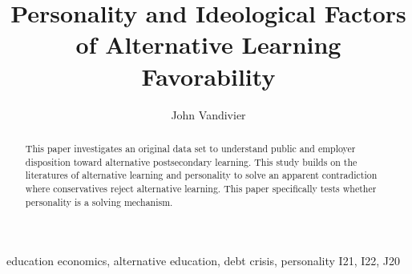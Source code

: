 \documentclass[review]{elsarticle}
\begin{document}
\begin{frontmatter}

    \title{
        Personality and Ideological Factors of Alternative Learning Favorability
    }

    \author[mymainaddress]{John Vandivier} %
    \address[mymainaddress]{4400 University Dr, Fairfax, VA 22030}

    \begin{abstract}
        This paper investigates an original data set to understand public
        and employer disposition toward alternative postsecondary learning.
        This study builds on the literatures of alternative learning and personality
        to solve an apparent contradiction where conservatives reject alternative learning.
        This paper specifically tests whether personality is a solving mechanism.
    \end{abstract}

    \begin{keyword}
        education economics, alternative education, debt crisis, personality
        \MSC[2010] I21, I22, J20 %
    \end{keyword}

\end{frontmatter}

\pagebreak
\linenumbers
\end{document}
